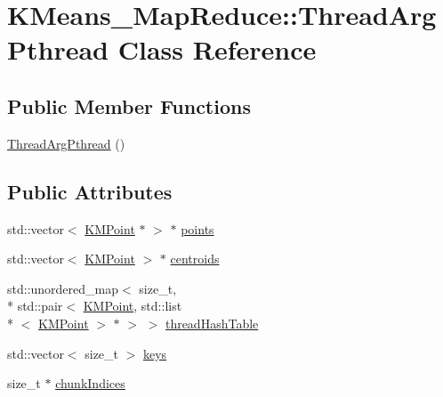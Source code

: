\hypertarget{classKMeans__MapReduce_1_1ThreadArgPthread}{\section{K\-Means\-\_\-\-Map\-Reduce\-:\-:Thread\-Arg\-Pthread Class Reference}
\label{classKMeans__MapReduce_1_1ThreadArgPthread}
}
\subsection*{Public Member Functions}
\begin{DoxyCompactItemize}
\item 
\hyperlink{classKMeans__MapReduce_1_1ThreadArgPthread_a608522e4518a5dd608107c8e4964bc88}{Thread\-Arg\-Pthread} ()
\end{DoxyCompactItemize}
\subsection*{Public Attributes}
\begin{DoxyCompactItemize}
\item 
std\-::vector$<$ \hyperlink{classKMeans__MapReduce_1_1KMPoint}{K\-M\-Point} $\ast$ $>$ $\ast$ \hyperlink{classKMeans__MapReduce_1_1ThreadArgPthread_a5ecf183694a66b482fc7e8c421273682}{points}
\item 
std\-::vector$<$ \hyperlink{classKMeans__MapReduce_1_1KMPoint}{K\-M\-Point} $>$ $\ast$ \hyperlink{classKMeans__MapReduce_1_1ThreadArgPthread_a1e5c64def4047acecb9bd1978654611a}{centroids}
\item 
std\-::unordered\-\_\-map$<$ size\-\_\-t, \\*
std\-::pair$<$ \hyperlink{classKMeans__MapReduce_1_1KMPoint}{K\-M\-Point}, std\-::list\\*
$<$ \hyperlink{classKMeans__MapReduce_1_1KMPoint}{K\-M\-Point} $>$ $\ast$ $>$ $>$ \hyperlink{classKMeans__MapReduce_1_1ThreadArgPthread_adaad7d178069921452515447c6a39e7d}{thread\-Hash\-Table}
\item 
std\-::vector$<$ size\-\_\-t $>$ \hyperlink{classKMeans__MapReduce_1_1ThreadArgPthread_ad02c67b8e65d23efdd4a5f1cea26b658}{keys}
\item 
size\-\_\-t $\ast$ \hyperlink{classKMeans__MapReduce_1_1ThreadArgPthread_aa440165b3414cf6a53a3308aecc932d0}{chunk\-Indices}
\end{DoxyCompactItemize}


